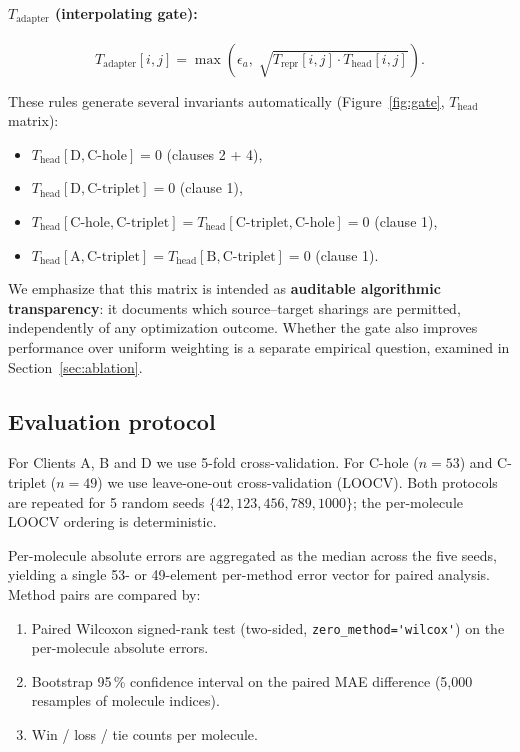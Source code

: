 \documentclass[11pt,a4paper]{article}
\begin{document}
\paragraph{$T_{\mathrm{adapter}}$ (interpolating gate):}
\[
T_{\mathrm{adapter}}[i, j] = \max\!\left(\epsilon_a,\; \sqrt{T_{\mathrm{repr}}[i, j]\cdot T_{\mathrm{head}}[i, j]}\right).
\]

These rules generate several invariants automatically (Figure~\ref{fig:gate}, $T_{\mathrm{head}}$ matrix):
\begin{itemize}
  \item $T_{\mathrm{head}}[\mathrm{D}, \mathrm{C\text{-}hole}] = 0$ (clauses 2 + 4),
  \item $T_{\mathrm{head}}[\mathrm{D}, \mathrm{C\text{-}triplet}] = 0$ (clause 1),
  \item $T_{\mathrm{head}}[\mathrm{C\text{-}hole}, \mathrm{C\text{-}triplet}] = T_{\mathrm{head}}[\mathrm{C\text{-}triplet}, \mathrm{C\text{-}hole}] = 0$ (clause 1),
  \item $T_{\mathrm{head}}[\mathrm{A}, \mathrm{C\text{-}triplet}] = T_{\mathrm{head}}[\mathrm{B}, \mathrm{C\text{-}triplet}] = 0$ (clause 1).
\end{itemize}

We emphasize that this matrix is intended as \textbf{auditable algorithmic transparency}: it documents which source--target sharings are permitted, independently of any optimization outcome. Whether the gate also improves performance over uniform weighting is a separate empirical question, examined in Section~\ref{sec:ablation}.

\subsection{Evaluation protocol}\label{sec:eval}

For Clients A, B and D we use 5-fold cross-validation. For C-hole ($n = 53$) and C-triplet ($n = 49$) we use leave-one-out cross-validation (LOOCV). Both protocols are repeated for 5 random seeds $\{42, 123, 456, 789, 1000\}$; the per-molecule LOOCV ordering is deterministic.

Per-molecule absolute errors are aggregated as the median across the five seeds, yielding a single 53- or 49-element per-method error vector for paired analysis. Method pairs are compared by:
\begin{enumerate}
  \item Paired Wilcoxon signed-rank test (two-sided, \verb|zero_method='wilcox'|) on the per-molecule absolute errors.
  \item Bootstrap 95\,\% confidence interval on the paired MAE difference (5{,}000 resamples of molecule indices).
  \item Win / loss / tie counts per molecule.
\end{enumerate}
\end{document}

